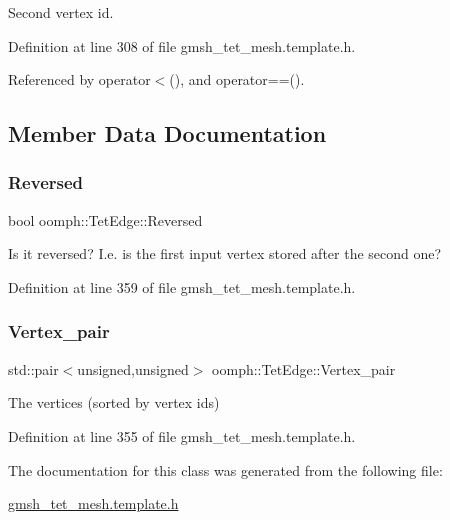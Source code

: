 Second vertex id. 



Definition at line 308 of file gmsh\+\_\+tet\+\_\+mesh.\+template.\+h.



Referenced by operator$<$(), and operator==().



\subsection{Member Data Documentation}
\mbox{\label{classoomph_1_1TetEdge_ad2832c145c84cf2655a2c02a8e86a4fa}} 
\subsubsection{\texorpdfstring{Reversed}{Reversed}}
{\footnotesize\ttfamily bool oomph\+::\+Tet\+Edge\+::\+Reversed\hspace{0.3cm}{\ttfamily [private]}}



Is it reversed? I.\+e. is the first input vertex stored after the second one? 



Definition at line 359 of file gmsh\+\_\+tet\+\_\+mesh.\+template.\+h.

\mbox{\label{classoomph_1_1TetEdge_a6dc6e07e15c5ffd5a2d7c162f4322eef}} 
\subsubsection{\texorpdfstring{Vertex\+\_\+pair}{Vertex\_pair}}
{\footnotesize\ttfamily std\+::pair$<$unsigned,unsigned$>$ oomph\+::\+Tet\+Edge\+::\+Vertex\+\_\+pair\hspace{0.3cm}{\ttfamily [private]}}



The vertices (sorted by vertex ids) 



Definition at line 355 of file gmsh\+\_\+tet\+\_\+mesh.\+template.\+h.



The documentation for this class was generated from the following file\+:\begin{DoxyCompactItemize}
\item 
\hyperlink{gmsh__tet__mesh_8template_8h}{gmsh\+\_\+tet\+\_\+mesh.\+template.\+h}\end{DoxyCompactItemize}

